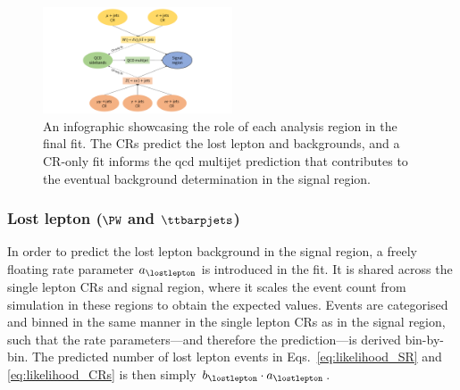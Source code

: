 \begin{figure}[htbp]
    \centering
    \includegraphics[width=0.5\textwidth]{figures/fit_overview.pdf}
    \caption[An infographic showcasing the role of each analysis region in the final fit]{An infographic showcasing the role of each analysis region in the final fit. The \glspl{CR} predict the lost lepton and \ztonunu backgrounds, and a \gls{CR}-only fit informs the \acrshort{qcd} multijet prediction that contributes to the eventual background determination in the signal region.}
    \label{fig:htoinv_fit_overview}
\end{figure}




\subsubsection{Lost lepton (\texorpdfstring{$\mkern-2mu\PW$}{W} and \texorpdfstring{$\ttbarpjets$}{ttbar plus jets})}
\label{subsubsec:htoinv_lost_lepton_bkg}

In order to predict the lost lepton background in the signal region, a freely floating rate parameter $a_{\lostlepton}$ is introduced in the fit. It is shared across the single lepton \glspl{CR} and signal region, where it scales the event count from simulation in these regions to obtain the expected values. Events are categorised and binned in the same manner in the single lepton \glspl{CR} as in the signal region, such that the rate parameters---and therefore the prediction---is derived bin-by-bin. The predicted number of lost lepton events in Eqs.~\ref{eq:likelihood_SR} and \ref{eq:likelihood_CRs} is then simply $b_{\lostlepton} \cdot a_{\lostlepton}$.




\subsubsection{\texorpdfstring{\ztonunupjets}{Z to nunu + jets}}
\label{subsubsec:htoinv_znunu_bkg}


